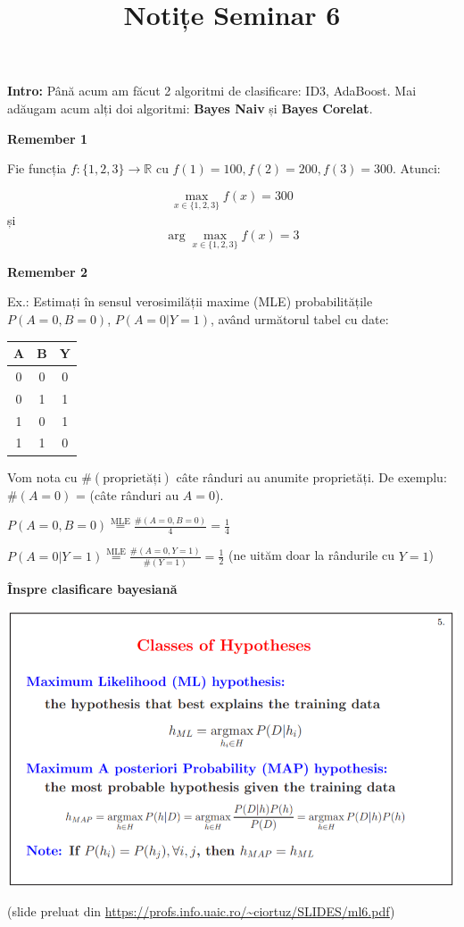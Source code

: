 \documentclass[12pt]{article}
\title{%
	\textbf{Notițe Seminar 6}}
\begin{document}
	
	\maketitle
	
	\textbf{{Intro:}} Până acum am făcut 2 algoritmi de clasificare: ID3, AdaBoost. Mai adăugam acum alți doi algoritmi: \textbf{Bayes Naiv} și \textbf{Bayes Corelat}.
	
	\textbf{Remember 1}
	
	Fie funcția $f : \{1,2,3\} \rightarrow \mathbb{R}$ cu $f(1) = 100, f(2) = 200, f(3) = 300$. Atunci:
	
	$$\max_{x \in \{1,2,3\}} f(x) = 300$$
	și 
	$$\arg \max_{x \in \{1,2,3\}} f(x) = 3$$
	
	
	
	
	\textbf{{Remember 2}}
	
	Ex.: Estimați în sensul verosimilății maxime (MLE) probabilitățile $P(A = 0,B = 0)$, $P(A=0|Y=1)$, având următorul tabel cu date:
	
	\begin{tabular}{ c | c || c }
		A & B & Y \\ 
		\hline
		0 & 0 & 0 \\  
		0 & 1 & 1 \\  
		1 & 0 & 1 \\  
		1 & 1 & 0
	\end{tabular}

	Vom nota cu $\#(\text{proprietăți})$ câte rânduri au anumite proprietăți. De exemplu: $\#(A=0)$  = (câte rânduri au $A=0$).

	$P(A=0,B=0) \stackrel{\text{MLE}}{=} \frac{\#(A=0,B=0)}{4} = \frac{1}{4}$
	
	$P(A=0|Y=1) \stackrel{\text{MLE}}{=} \frac{\#(A=0,Y=1)}{\#(Y=1)} = \frac{1}{2}$ (ne uităm doar la rândurile cu $Y=1$)
	
	\newpage
	\textbf{\large{Înspre clasificare bayesiană}}
	
	\begin{center}
		\includegraphics[width=1\linewidth]{screenshot001}
	\end{center}
	(slide preluat din \url{https://profs.info.uaic.ro/~ciortuz/SLIDES/ml6.pdf})
	
\end{document}
